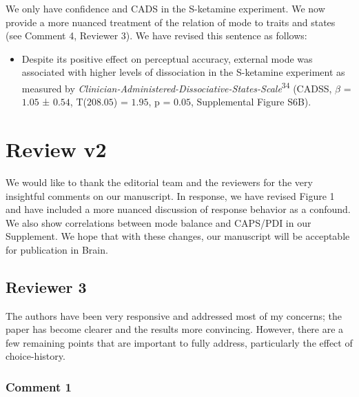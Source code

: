 \documentclass[
]{article}
\providecommand{\tightlist}{%
  \setlength{\itemsep}{0pt}\setlength{\parskip}{0pt}}
\begin{document}
We only have confidence and CADS in the S-ketamine experiment. We now
provide a more nuanced treatment of the relation of mode to traits and
states (see Comment 4, Reviewer 3). We have revised this sentence as
follows:

\begin{itemize}
\tightlist
\item
  Despite its positive effect on perceptual accuracy, external mode was
  associated with higher levels of dissociation in the S-ketamine
  experiment as measured by
  \emph{Clinician-Administered-Dissociative-States-Scale}\textsuperscript{34}
  (CADSS, \(\beta\) = \(1.05\) ± \(0.54\), T(\(208.05\)) = \(1.95\), p =
  \(0.05\), Supplemental Figure S6B).
\end{itemize}

\newpage

\section{Review v2}\label{review-v2}

We would like to thank the editorial team and the reviewers for the very
insightful comments on our manuscript. In response, we have revised
Figure 1 and have included a more nuanced discussion of response
behavior as a confound. We also show correlations between mode balance
and CAPS/PDI in our Supplement. We hope that with these changes, our
manuscript will be acceptable for publication in Brain.

\subsection{Reviewer 3}\label{reviewer-3}

The authors have been very responsive and addressed most of my concerns;
the paper has become clearer and the results more convincing. However,
there are a few remaining points that are important to fully address,
particularly the effect of choice-history.

\subsubsection{Comment 1}\label{comment-1-3}
\end{document}
